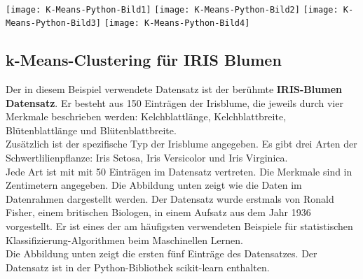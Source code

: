 \documentclass[12pt]{article}
\begin{document}
{\color{red}{***********************************************************************\\ 
Ab hier bis Ende der Section sind die Folien der Vorlesung ML  zu nutzen und diese sind in Latex umzusetzen...\\
************************************************************************}}\\[0.2cm]


\begin{center}
\hspace*{-2.0cm}   
\texttt{[image: K-Means-Python-Bild1]}
\hspace*{-2.0cm}   
\texttt{[image: K-Means-Python-Bild2]}
\hspace*{-2.0cm} 
\texttt{[image: K-Means-Python-Bild3]}
\hspace*{-2.0cm} 
\texttt{[image: K-Means-Python-Bild4]}
\end{center}

\subsection{k-Means-Clustering für IRIS Blumen}


Der in diesem Beispiel verwendete Datensatz ist der berühmte \textbf{IRIS-Blumen Datensatz}. Er besteht aus 150 Einträgen der Irisblume, die jeweils durch vier Merkmale beschrieben werden: Kelchblattlänge, Kelchblattbreite, Blütenblattlänge und
Blütenblattbreite. \\[0.2cm]
Zusätzlich ist der spezifische Typ der Irisblume angegeben. Es gibt drei Arten
der Schwertlilienpflanze: Iris Setosa, Iris Versicolor und Iris Virginica.\\
Jede Art ist mit mit 50 Einträgen im Datensatz vertreten. Die Merkmale sind in Zentimetern angegeben. Die Abbildung unten zeigt wie die Daten im Datenrahmen dargestellt werden. Der Datensatz wurde erstmals von Ronald Fisher, einem britischen Biologen, in einem Aufsatz aus dem Jahr 1936 vorgestellt. Er ist eines der am häufigsten verwendeten Beispiele für statistischen Klassifizierung-Algorithmen beim Maschinellen Lernen. \\
Die Abbildung unten zeigt die ersten fünf Einträge des Datensatzes. Der Datensatz ist in der Python-Bibliothek scikit-learn enthalten.\\ 
\end{document}
